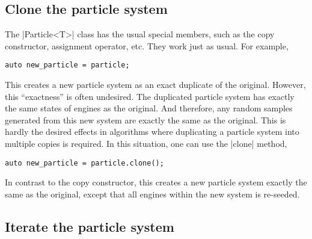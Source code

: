 \subsection{Clone the particle system}
\label{sub:Clone the particle system}

The |Particle<T>| class has the usual special members, such as the copy
constructor, assignment operator, etc. They work just as usual. For example,
\begin{verbatim}
auto new_particle = particle;
\end{verbatim}
This creates a new particle system as an exact duplicate of the original.
However, this ``exactness'' is often undesired. The duplicated particle system
has exactly the same states of \rng engines as the original. And therefore, any
random samples generated from this new system are exactly the same as the
original. This is hardly the desired effects in algorithms where duplicating a
particle system into multiple copies is required. In this situation, one can
use the |clone| method,
\begin{verbatim}
auto new_particle = particle.clone();
\end{verbatim}
In contrast to the copy constructor, this creates a new particle system exactly
the same as the original, except that all \rng engines within the new system is
re-seeded.

\subsection{Iterate the particle system}
\label{sub:Iterate the particle system}

